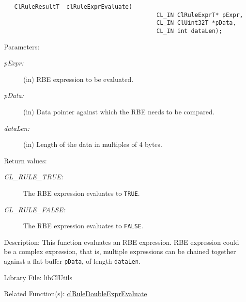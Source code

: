 \begin{flushleft}
\begin{Desc}
\footnotesize\begin{verbatim}   ClRuleResultT  clRuleExprEvaluate(
                              				CL_IN ClRuleExprT* pExpr,
                              				CL_IN ClUint32T *pData,
                              				CL_IN int dataLen);
\end{verbatim}
\normalsize
\end{Desc}
\begin{Desc}
\item[Parameters:]
\begin{description}
\item[{\em p\-Expr:}](in) RBE expression to be evaluated. \item[{\em p\-Data:}](in) Data pointer against which the RBE needs to be compared.
\item[{\em data\-Len:}](in) Length of the data in multiples of 4 bytes.\end{description}
\end{Desc}
\begin{Desc}
\item[Return values:]
\begin{description}
\item[{\em CL\_\-RULE\_\-TRUE:}]The RBE expression evaluates to {\tt{TRUE}}. 
\item[{\em CL\_\-RULE\_\-FALSE:}]The RBE expression evaluates to {\tt{FALSE}}.\end{description}
\end{Desc}
\begin{Desc}
\item[Description:]This function evaluates an RBE expression. RBE expression could be a complex expression, that is, multiple expressions can be chained 
together against a flat buffer {\tt{p\-Data}}, of length {\tt{data\-Len}}.\end{Desc}
\begin{Desc}
\item[Library File:]lib\-Cl\-Utils\end{Desc}
\begin{Desc}
\item[Related Function(s):]\hyperlink{pagerule106}{cl\-Rule\-Double\-Expr\-Evaluate} \end{Desc}
\newpage


\end{flushleft}

